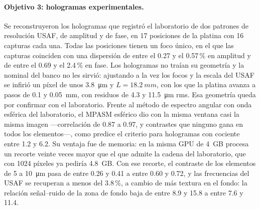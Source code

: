 \paragraph{Objetivo 3: hologramas experimentales.} Se reconstruyeron los
hologramas que registró el laboratorio de dos patrones de resolución USAF, de
amplitud y de fase, en 17 posiciones de la platina con 16 capturas cada una.
Todas las posiciones tienen un foco único, en el que las capturas coinciden
con una dispersión de entre el 0.27 y el 0.57\,\% en amplitud y de entre el
0.69 y el 2.4\,\% en fase. Los hologramas no traían su geometría y la nominal
del banco no les sirvió: ajustando a la vez los focos y la escala del USAF se
infirió un píxel de unos \SI{3.8}{\micro\metre} y $L = \SI{18.2}{mm}$, con los
que la platina avanza a pasos de 0.1 y \SI{0.05}{mm}, con residuos de 4.3 y
\SI{11.5}{\micro\metre} rms. Esa geometría queda por confirmar con el
laboratorio. Frente al método de espectro angular con onda esférica del
laboratorio, el MPASM esférico dio con la misma ventana casi la misma imagen
---correlación de 0.87 a 0.97, y contrastes que ninguno gana en todos los
elementos---, como predice el criterio para hologramas con cociente entre 1.2
y 6.2. Su ventaja fue de memoria: en la misma GPU de \SI{4}{GB} procesa un
recorte veinte veces mayor que el que admite la cadena del laboratorio, que
con 1024 píxeles ya pediría \SI{4.8}{GB}. Con ese recorte, el contraste de los
elementos de 5 a \SI{10}{\micro\metre} pasa de entre 0.26 y 0.41 a entre 0.60
y 0.72, y las frecuencias del USAF se recuperan a menos del 3.8\,\%, a cambio
de más textura en el fondo: la relación señal--ruido de la zona de fondo baja
de entre 8.9 y 15.8 a entre 7.6 y 11.4.

